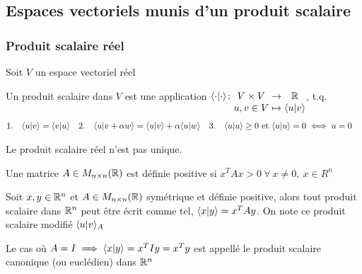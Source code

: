 \subsection{Espaces vectoriels munis d'un produit scalaire}

\subsubsection{Produit scalaire réel}
Soit $V$ un espace vectoriel réel
\begin{definition}
      \label{scpr_Real}
      Un produit scalaire dans $V$ est une application $\myfunc{\scpr{\cdot}{\cdot}}{V \times V}{\R}{u, v \in V}{\scpr{u}{v}}$, t.q.
      \begin{align*}
            &1. \quad \langle u \lvert v \rangle = \langle v \lvert u \rangle& &2. \quad \langle u \lvert v + \alpha w \rangle = \langle u \lvert v \rangle + \alpha \langle u \lvert w \rangle& &3. \quad \langle u \lvert u \rangle \geq 0 \ \text{et} \ \langle u \lvert u \rangle = 0 \iff u = 0&
      \end{align*}
\end{definition}
\begin{remark}
      Le produit scalaire réel n'est pas unique. 
\end{remark}
\begin{definition}
      Une matrice $A \in M_{n \times n}(\mathbb{R})$ est définie positive si $x^T A x > 0 \ \forall \ x \neq 0, \ x \in R^n$
\end{definition}
\begin{lemma}
      Soit $x,y \in \mathbb{R}^n$ et $A \in M_{n \times n}(\mathbb{R})$ symétrique et définie positive, alors tout produit scalaire dans $\mathbb{R}^n$ 
      peut être écrit comme tel, $\langle x \lvert y \rangle = x^T A y$. On note ce produit scalaire modifié $\langle u \lvert v \rangle_A$
\end{lemma}
\begin{definition}
      Le cas où $A = I \implies \langle x \lvert y \rangle = x^T I y = x^T y$ est appellé le produit scalaire 
      canonique (ou euclédien) dans $\mathbb{R}^n$
\end{definition}

